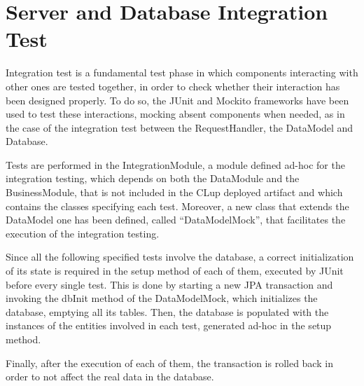 \documentclass[a4paper,oneside,11pt]{book}
\begin{document}
    \section{Server and Database Integration Test}
    Integration test is a fundamental test phase in which components interacting with other ones are tested together, in order to check whether their interaction has been designed properly. To do so, the JUnit and Mockito frameworks have been used to test these interactions, mocking absent components when needed, as in the case of the integration test between the RequestHandler, the DataModel and Database. \par
    Tests are performed in the IntegrationModule, a module defined ad-hoc for the integration testing, which depends on both the DataModule and the BusinessModule, that is not included in the CLup deployed artifact and which contains the classes specifying each test. Moreover, a new class that extends the DataModel one has been defined, called “DataModelMock”, that facilitates the execution of the integration testing. \par
    Since all the following specified tests involve the database, a correct initialization of its state is required in the setup method of each of them, executed by JUnit before every single test. This is done by starting a new JPA transaction and invoking the dbInit method of the DataModelMock, which initializes the database, emptying all its tables. Then, the database is populated with the instances of the entities involved in each test, generated ad-hoc in the setup method. \par
    Finally, after the execution of each of them, the transaction is rolled back in order to not affect the real data in the database.

    \newpage
\end{document}
